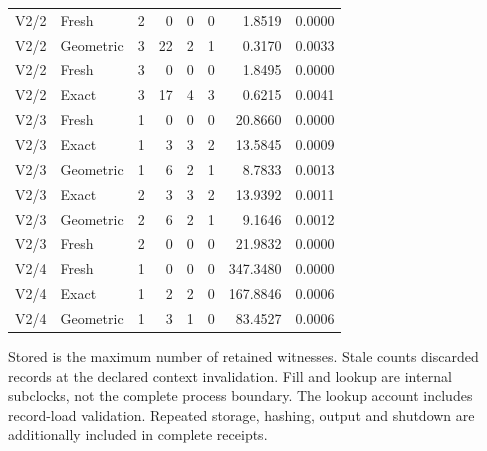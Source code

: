 \begin{longtable}{llrrrrrr}
V2/2 & Fresh & 2 & 0 & 0 & 0 & 1.8519 & 0.0000 \\
V2/2 & Geometric & 3 & 22 & 2 & 1 & 0.3170 & 0.0033 \\
V2/2 & Fresh & 3 & 0 & 0 & 0 & 1.8495 & 0.0000 \\
V2/2 & Exact & 3 & 17 & 4 & 3 & 0.6215 & 0.0041 \\
V2/3 & Fresh & 1 & 0 & 0 & 0 & 20.8660 & 0.0000 \\
V2/3 & Exact & 1 & 3 & 3 & 2 & 13.5845 & 0.0009 \\
V2/3 & Geometric & 1 & 6 & 2 & 1 & 8.7833 & 0.0013 \\
V2/3 & Exact & 2 & 3 & 3 & 2 & 13.9392 & 0.0011 \\
V2/3 & Geometric & 2 & 6 & 2 & 1 & 9.1646 & 0.0012 \\
V2/3 & Fresh & 2 & 0 & 0 & 0 & 21.9832 & 0.0000 \\
V2/4 & Fresh & 1 & 0 & 0 & 0 & 347.3480 & 0.0000 \\
V2/4 & Exact & 1 & 2 & 2 & 0 & 167.8846 & 0.0006 \\
V2/4 & Geometric & 1 & 3 & 1 & 0 & 83.4527 & 0.0006 \\
\hline
\end{longtable}\endgroup
{\footnotesize Stored is the maximum number of retained witnesses. Stale counts discarded records at the declared context invalidation. Fill and lookup are internal subclocks, not the complete process boundary. The lookup account includes record-load validation. Repeated storage, hashing, output and shutdown are additionally included in complete receipts.}
